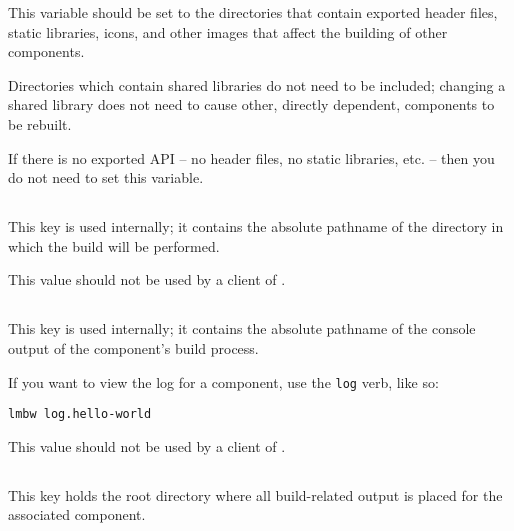 This variable should be set to the directories that contain exported
header files, static libraries, icons, and other images that affect
the building of other components.

Directories which contain shared libraries do not need to be included;
changing a shared library does not need to cause other, directly
dependent, components to be rebuilt.

If there is no exported API -- no header files, no static libraries,
etc. -- then you do not need to set this variable.


\subsection{}\label{variables:build-directory}

This key is used internally; it contains the absolute pathname of the
directory in which the build will be performed.

This value should not be used by a client of \lmsbw.


\subsection{}\label{variables:build-log}

This key is used internally; it contains the absolute pathname of the
console output of the component's build process.

If you want to view the log for a component, use the \texttt{log}
verb, like so:

\begin{verbatim}
lmbw log.hello-world
\end{verbatim}

This value should not be used by a client of \lmsbw.


\subsection{}\label{variables:build-root-directory}

This key holds the root directory where all build-related output is
placed for the associated component.

